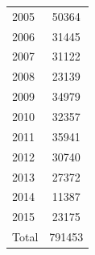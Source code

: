 \begin{table}[H]
\begin{tabular}{lc}
		2005 & 50364                                     \\
		2006 & 31445                                     \\
		2007 & 31122                                     \\
		2008 & 23139                                     \\
		2009 & 34979                                     \\
		2010 & 32357                                     \\
		2011 & 35941                                     \\
		2012 & 30740                                     \\
		2013 & 27372                                     \\
		2014 & 11387                                     \\
		2015 & 23175                                     \\ \hline
		Total & 791453                                   \\
		\hline
	\end{tabular}
\end{table}


